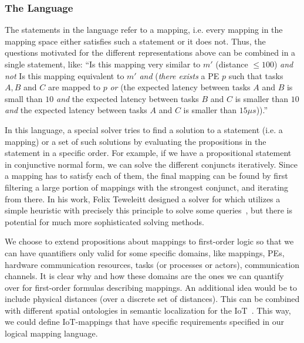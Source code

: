 \subsubsection{The Language}

The statements in the language refer to a mapping, i.e. every mapping in the mapping space either satisfies such a statement or it does not.
Thus, the questions motivated for the different representations above can be combined in a single statement, like:
``Is this mapping very similar to $m'$ (distance $\leq 100$) \emph{and} \emph{not} Is this mapping equivalent to $m'$ \emph{and} (\emph{there exists} a PE $p$ such that tasks $A, B$ and $C$ are mapped to $p$ \emph{or} (the expected latency between tasks $A$ and $B$ is small than $10$ \emph{and} the expected latency between tasks $B$ and $C$ is smaller than $10$ \emph{and} the expected latency between tasks $A$ and $C$ is smaller than $15 \mu s$)).''

In this language, a special solver tries to find a solution to a statement (i.e. a mapping) or a set of such solutions by evaluating the propositions in the statement in a specific order.
For example, if we have a propositional statement in conjunctive normal form, we can solve the different conjuncts iteratively.
Since a mapping has to satisfy each of them, the final mapping can be found by first filtering a large portion of mappings with the strongest conjunct, and iterating from there.
In his work, Felix Teweleitt designed a solver for \mocasin which utilizes a simple heuristic with precisely this principle to solve some queries~\cite{teweleitt_studienarbeit}, but there is potential for much more sophisticated solving methods.

We choose to extend propositions about mappings to first-order logic so that we can have quantifiers only valid for some specific domains, like mappings, \acp{PE}, hardware communication resources, tasks (or processes or actors), communication channels.
It is clear why and how these domains are the ones we can quantify over for first-order formulas describing mappings.
An additional idea would be to include physical distances (over a discrete set of distances).
This can be combined with different spatial ontologies in semantic localization for the \acf{IoT}~\cite{weber_phdthesis}. 
This way, we could define \ac{IoT}-mappings that have specific requirements specified in our logical mapping  language.

